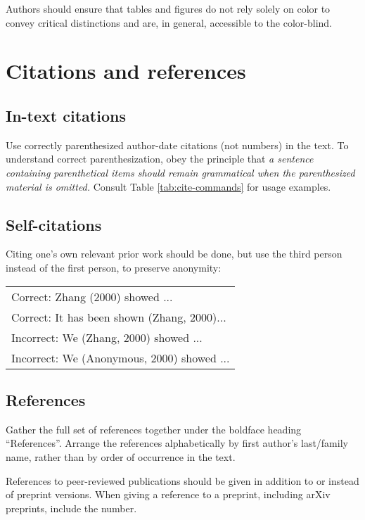 \documentclass[11pt,a4paper]{article}
\newcommand{\ex}[1]{{\sf #1}}
\begin{document}
Authors should ensure that tables and figures do not rely solely on color to
convey critical distinctions and are, in general,  accessible to the
color-blind.



\section{Citations and references}
\label{sec:cite}


\subsection{In-text citations}
\label{sec:in-text-cite}
Use correctly parenthesized author-date citations
(not numbers) in the text. To understand correct parenthesization, obey the
principle that \emph{a sentence containing parenthetical items should remain
grammatical when the parenthesized material is omitted.} Consult Table
\ref{tab:cite-commands} for usage examples.


\iftaclpubformat
\else
\subsection{Self-citations}
\label{sec:self-cite}

Citing one's own relevant prior work should be done,  but use the third
person instead of the first person, to preserve anonymity:
\begin{tabular}{l}
Correct: \ex{Zhang (2000) showed ...} \\
Correct: \ex{It has been shown (Zhang, 2000)...} \\
Incorrect: \ex{We (Zhang, 2000) showed ...} \\
Incorrect: \ex{We (Anonymous, 2000) showed ...}
\end{tabular}
\fi

\subsection{References}
\label{sec:references}
Gather the full set of references together under
the boldface heading ``References''. Arrange the references alphabetically
by first author's last/family name, rather than by order of occurrence in the
text.

References to peer-reviewed publications should be given in addition to or
instead of preprint versions. When giving a reference to a preprint, including
arXiv preprints, include the number.
\end{document}
